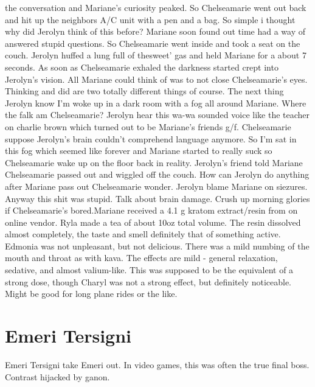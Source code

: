\documentclass[12pt]{book}
\begin{document}
the conversation and Mariane's curiosity peaked. So Chelseamarie went out back and hit up the neighbors A/C unit with a pen and a bag. So simple i thought why did Jerolyn think of this before? Mariane soon found out time had a way of answered stupid questions. So Chelseamarie went inside and took a seat on the couch. Jerolyn huffed a lung full of thesweet' gas and held Mariane for a about 7 seconds. As soon as Chelseamarie exhaled the darkness started crept into Jerolyn's vision. All Mariane could think of was to not close Chelseamarie's eyes. Thinking and did are two totally different things of course. The next thing Jerolyn know I'm woke up in a dark room with a fog all around Mariane. Where the falk am Chelseamarie? Jerolyn hear this wa-wa sounded voice like the teacher on charlie brown which turned out to be Mariane's friends g/f. Chelseamarie suppose Jerolyn's brain couldn't comprehend language anymore. So I'm sat in this fog which seemed like forever and Mariane started to really suck so Chelseamarie wake up on the floor back in reality. Jerolyn's friend told Mariane Chelseamarie passed out and wiggled off the couch. How can Jerolyn do anything after Mariane pass out Chelseamarie wonder. Jerolyn blame Mariane on siezures. Anyway this shit was stupid. Talk about brain damage. Crush up morning glories if Chelseamarie's bored.Mariane received a 4.1 g kratom extract/resin from on online vendor. Ryla made a tea of about 10oz total volume. The resin dissolved almost completely, the taste and smell definitely that of something active. Edmonia was not unpleasant, but not delicious. There was a mild numbing of the mouth and throat as with kava. The effects are mild - general relaxation, sedative, and almost valium-like. This was supposed to be the equivalent of a strong dose, though Charyl was not a strong effect, but definitely noticeable. Might be good for long plane rides or the like.



\chapter{Emeri Tersigni}

Emeri Tersigni take Emeri out. In video games, this was often the true final boss. Contrast hijacked by ganon.
\end{document}
